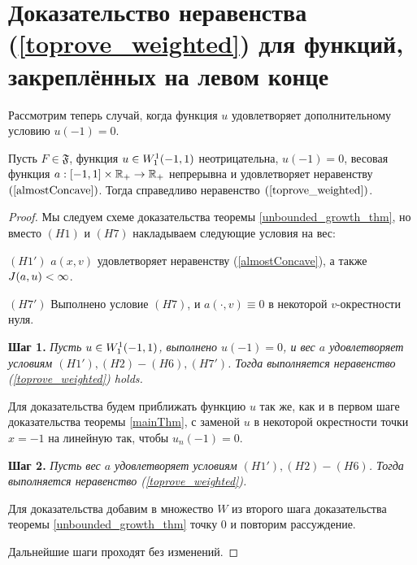\section{Доказательство неравенства (\ref{toprove_weighted}) для функций, закреплённых на левом конце}

Рассмотрим теперь случай, когда функция $u$ удовлетворяет дополнительному условию $u(-1) = 0$.
\begin{thm}
Пусть $F \in \mathfrak{F}$, функция $u \in W_1^1(-1, 1)$ неотрицательна, $u(-1) = 0$,
весовая функция $a: [-1, 1] \times \mathbb R_+ \to \mathbb R_+$ непрерывна и удовлетворяет неравенству $(\ref{almostConcave})$.
Тогда справедливо неравенство $(\ref{toprove_weighted})$.
\end{thm}

\begin{proof}
Мы следуем схеме доказательства теоремы \ref{unbounded_growth_thm},
но вместо $(H1)$ и $(H7)$ накладываем следующие условия на вес:

\bigskip
\noindent
$(H1')$ $a(x, v)$ удовлетворяет неравенству (\ref{almostConcave}), а также $J(a, u) < \infty$.

\bigskip
\noindent
$(H7')$ Выполнено условие $(H7)$, и $a(\cdot, v) \equiv 0$ в некоторой $v$-окрестности нуля.

\bigskip
\textbf{Шаг 1.}
\textit{Пусть $u \in W_1^1(-1, 1)$, выполнено $u(-1) = 0$, и вес $a$ удовлетворяет условиям $(H1'), (H2)-(H6), (H7')$.
Тогда выполняется неравенство (\ref{toprove_weighted}) holds.}

Для доказательства будем приближать функцию $u$ так же, как и в первом шаге доказательства теоремы \ref{mainThm},
с заменой $u$ в некоторой окрестности точки $x = -1$ на линейную так, чтобы $u_n(-1) = 0$.

\bigskip
\textbf{Шаг 2.}
\textit{Пусть вес $a$ удовлетворяет условиям $(H1'), (H2)-(H6)$.
Тогда выполняется неравенство (\ref{toprove_weighted}).}

Для доказательства добавим в множество $W$ из второго шага доказательства теоремы \ref{unbounded_growth_thm} точку $0$
и повторим рассуждение.

\medskip

Дальнейшие шаги проходят без изменений.
\end{proof}
